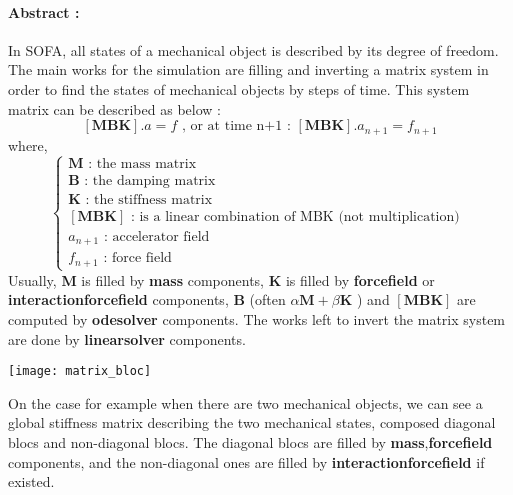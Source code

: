 \documentclass[a4paper,10pt]{article}
\begin{document}
\paragraph{Abstract : }
In SOFA, all states of a mechanical object is described by its degree of freedom. The main works for the simulation are filling and inverting a matrix system in order to find the states of mechanical objects by steps of time. This system matrix can be described as below :
 \[
\left[ \textbf{MBK} \right].a=f \text{    ,  or at time n+1 :   }\left[ \textbf{MBK} \right].a_{n+1}=f_{n+1}
\]
where,
\[
\left\{ 
\begin{array}{l}
\textbf{M} \text { : the mass matrix   }  \\
\textbf{B} \text { : the damping matrix   }  \\
\textbf{K} \text { : the stiffness matrix   }  \\
\left[ \textbf{MBK} \right] \text {  : is a linear combination of MBK (not multiplication)   }  \\
a_{n+1} \text { : accelerator field} \\
f_{n+1} \text { : force field} 
\end{array}\right.
\]
 Usually, \textbf{M} is filled by \textbf{\color{orange}mass} components, \textbf{K} is filled by \textbf{\color{orange}forcefield} or \textbf{\color{orange}interactionforcefield} components, \textbf{B} (often $\alpha\textbf{M}+\beta\textbf{K}$ ) and $\left[ \textbf{MBK} \right]$ are computed by \textbf{\color{orange}odesolver} components. The works left to invert the matrix system are done by \textbf{\color{orange}linearsolver} components.
\begin{center}
\texttt{[image: matrix\_bloc]}
\end{center}
On the case for example when there are two mechanical objects, we can see a global stiffness matrix describing the two mechanical states, composed diagonal blocs and non-diagonal blocs. The diagonal blocs are filled by \textbf{\color{orange}mass},\textbf{\color{orange}forcefield} components, and the non-diagonal ones are filled by \textbf{\color{orange}interactionforcefield} if existed.
\end{document}
